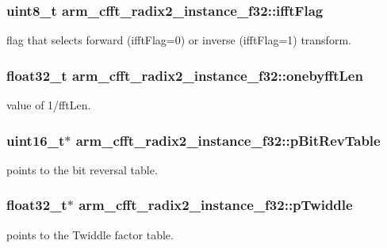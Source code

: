 \subsubsection[{\texorpdfstring{ifft\+Flag}{ifftFlag}}]{\setlength{\rightskip}{0pt plus 5cm}uint8\+\_\+t arm\+\_\+cfft\+\_\+radix2\+\_\+instance\+\_\+f32\+::ifft\+Flag}\hypertarget{structarm__cfft__radix2__instance__f32_a8dbe98d2c924e35e0a3fed2fe948176f}{}\label{structarm__cfft__radix2__instance__f32_a8dbe98d2c924e35e0a3fed2fe948176f}
flag that selects forward (ifft\+Flag=0) or inverse (ifft\+Flag=1) transform. 
\subsubsection[{\texorpdfstring{onebyfft\+Len}{onebyfftLen}}]{\setlength{\rightskip}{0pt plus 5cm}float32\+\_\+t arm\+\_\+cfft\+\_\+radix2\+\_\+instance\+\_\+f32\+::onebyfft\+Len}\hypertarget{structarm__cfft__radix2__instance__f32_a1d3d289d47443e597d88a40effd14b8f}{}\label{structarm__cfft__radix2__instance__f32_a1d3d289d47443e597d88a40effd14b8f}
value of 1/fft\+Len. 
\subsubsection[{\texorpdfstring{p\+Bit\+Rev\+Table}{pBitRevTable}}]{\setlength{\rightskip}{0pt plus 5cm}uint16\+\_\+t$\ast$ arm\+\_\+cfft\+\_\+radix2\+\_\+instance\+\_\+f32\+::p\+Bit\+Rev\+Table}\hypertarget{structarm__cfft__radix2__instance__f32_a92b8fa0a151cd800436094903a5ca0a4}{}\label{structarm__cfft__radix2__instance__f32_a92b8fa0a151cd800436094903a5ca0a4}
points to the bit reversal table. 
\subsubsection[{\texorpdfstring{p\+Twiddle}{pTwiddle}}]{\setlength{\rightskip}{0pt plus 5cm}float32\+\_\+t$\ast$ arm\+\_\+cfft\+\_\+radix2\+\_\+instance\+\_\+f32\+::p\+Twiddle}\hypertarget{structarm__cfft__radix2__instance__f32_adb0c9d47dbfbd90a6f6ed0a05313a974}{}\label{structarm__cfft__radix2__instance__f32_adb0c9d47dbfbd90a6f6ed0a05313a974}
points to the Twiddle factor table. 

